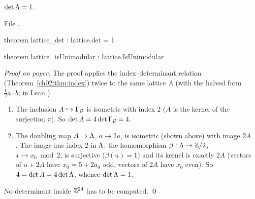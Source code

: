 \begin{theorem}\label{ch02:thm:leechdet}
$\det{\Lambda}=1$.
\end{theorem}
\noindent File .
\begin{leancode}
theorem lattice_det : lattice.det = 1

theorem lattice_isUnimodular : lattice.IsUnimodular
\end{leancode}
\emph{Proof on paper.}  The proof applies the index--determinant relation
(Theorem~\ref{ch02:thm:index}) twice to the same lattice $A$ (with the halved form
$\tfrac12a\cdot b$; in Lean ).
\begin{enumerate}
\item The inclusion $A\hookrightarrow\Gamma_{\mathcal{G}}$ is isometric with index $2$ ($A$ is the
kernel of the surjection $\pi$).  So $\det A=4\det\Gamma_{\mathcal{G}}=4$.
\item The doubling map $A\to{\Lambda}$, $a\mapsto2a$, is isometric (shown above) with image $2A$.
The image has index $2$ in ${\Lambda}$: the homomorphism $\beta:{\Lambda}\to{\mathbb{Z}}/2$, $x\mapsto
x_0\bmod2$, is surjective ($\beta(u)=1$) and its kernel is exactly $2A$ (vectors of $u+2A$ have
$x_0=5+2a_0$ odd, vectors of $2A$ have $x_0$ even).  So $4=\det A=4\det{\Lambda}$, whence
$\det{\Lambda}=1$.
\end{enumerate}
No determinant inside ${\mathbb{Z}}^{24}$ has to be computed.  \qed


